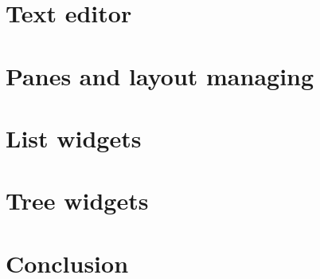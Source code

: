 \documentclass[a4paper,10pt,twoside]{book}
\begin{document}
\section{Text editor}

\section{Panes and layout managing}

\section{List widgets}

\section{Tree widgets}

\section{Conclusion}

\ifx\wholebook\relax\else
   
   
\end{document}
